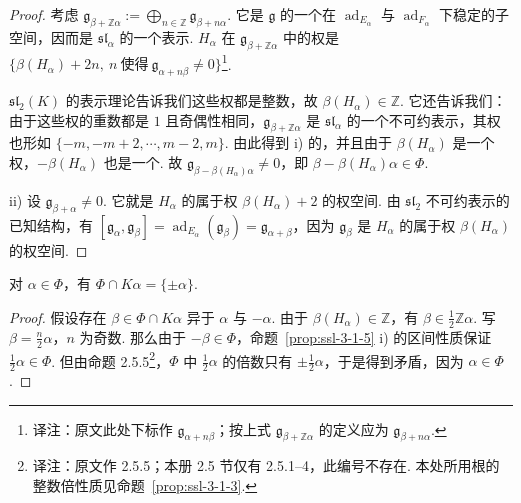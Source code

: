 \begin{proof}
考虑 $\mathfrak g_{\beta+\mathbb Z\alpha}:=\bigoplus_{n\in\mathbb Z}\mathfrak g_{\beta+n\alpha}$. 它是 $\mathfrak g$ 的一个在 $\operatorname{ad}_{E_\alpha}$ 与 $\operatorname{ad}_{F_\alpha}$ 下稳定的子空间，因而是 $\mathfrak{sl}_\alpha$ 的一个表示. $H_\alpha$ 在 $\mathfrak g_{\beta+\mathbb Z\alpha}$ 中的权是 $\{\beta(H_\alpha)+2n,\ n\ \text{使得}\ \mathfrak g_{\alpha+n\beta}\neq 0\}$\footnote{译注：原文此处下标作 $\mathfrak g_{\alpha+n\beta}$；按上式 $\mathfrak g_{\beta+\mathbb Z\alpha}$ 的定义应为 $\mathfrak g_{\beta+n\alpha}$.}.

$\mathfrak{sl}_2(K)$ 的表示理论告诉我们这些权都是整数，故 $\beta(H_\alpha)\in\mathbb Z$. 它还告诉我们：由于这些权的重数都是 $1$ 且奇偶性相同，$\mathfrak g_{\beta+\mathbb Z\alpha}$ 是 $\mathfrak{sl}_\alpha$ 的一个不可约表示，其权也形如 $\{-m,-m+2,\cdots,m-2,m\}$. 由此得到 i) 的，并且由于 $\beta(H_\alpha)$ 是一个权，$-\beta(H_\alpha)$ 也是一个. 故 $\mathfrak g_{\beta-\beta(H_\alpha)\alpha}\neq 0$，即 $\beta-\beta(H_\alpha)\alpha\in\Phi$.

ii) 设 $\mathfrak g_{\beta+\alpha}\neq 0$. 它就是 $H_\alpha$ 的属于权 $\beta(H_\alpha)+2$ 的权空间. 由 $\mathfrak{sl}_2$ 不可约表示的已知结构，有 $[\mathfrak g_\alpha,\mathfrak g_\beta]=\operatorname{ad}_{E_\alpha}(\mathfrak g_\beta)=\mathfrak g_{\alpha+\beta}$，因为 $\mathfrak g_\beta$ 是 $H_\alpha$ 的属于权 $\beta(H_\alpha)$ 的权空间.
\end{proof}
\begin{corollary*}
对 $\alpha\in\Phi$，有 $\Phi\cap K\alpha=\{\pm\alpha\}$.
\end{corollary*}
\begin{proof}
假设存在 $\beta\in\Phi\cap K\alpha$ 异于 $\alpha$ 与 $-\alpha$. 由于 $\beta(H_\alpha)\in\mathbb Z$，有 $\beta\in\frac{1}{2}\mathbb Z\alpha$. 写 $\beta=\frac{n}{2}\alpha$，$n$ 为奇数. 那么由于 $-\beta\in\Phi$，命题~\ref{prop:ssl-3-1-5} i) 的区间性质保证 $\frac{1}{2}\alpha\in\Phi$. 但由命题 2.5.5\footnote{译注：原文作 2.5.5；本册 2.5 节仅有 2.5.1--4，此编号不存在. 本处所用根的整数倍性质见命题~\ref{prop:ssl-3-1-3}.}，$\Phi$ 中 $\frac{1}{2}\alpha$ 的倍数只有 $\pm\frac{1}{2}\alpha$，于是得到矛盾，因为 $\alpha\in\Phi$.
\end{proof}

